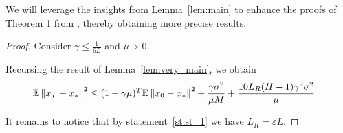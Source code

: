 We will leverage the insights from Lemma~\ref{lem:main} to enhance the proofs of Theorem 1 from \cite{Khaled}, thereby obtaining more precise results.

\begin{proof}
    Consider $\gamma \leq \frac{1}{6L}$ and $\mu > 0$.
    

    Recursing the result of Lemma~\ref{lem:very_main}, we obtain
    \begin{align}
        \mathbb{E} \left\|\bar{x}_{T}-x_*\right\|^2 
        & \leq (1 - \gamma \mu)^T \mathbb{E} \left\|\bar{x}_0 - x_*\right\|^2 
        + \frac{\gamma \sigma^2} {\mu M} 
        + \frac{10 L_R (H-1) \gamma^2 \sigma^2}{\mu}
    \end{align}

    It remains to notice that by statement~\ref{st:st_1} we have $L_R = \varepsilon L$.
\end{proof}

